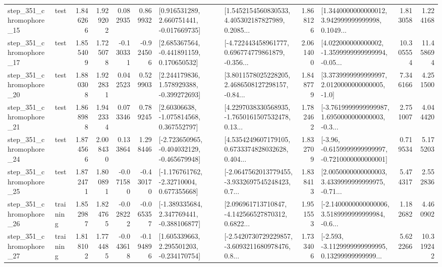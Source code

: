 \begin{tabular}{llrrrrllrlrr}
  step\_351\_chromophore\_15 &      test &      1.846266 &    1.929202 &      0.082935 &  0.869932 &    [0.916531289, 2.660751441, -0.017669735] &  [1.5452154560830533, 4.405302187827989, 0.2085... &       1.868126 &  [1.3440000000000012, 3.942999999999998, 0.1049... &            1.813058 &          1.224168 \\
  step\_351\_chromophore\_17 &      test &      1.855409 &    1.725078 &     -0.130331 & -0.924506 &    [2.685367564, -0.441891159, 0.170650532] &  [-4.722443458961777, 0.696774779861879, -0.356... &       2.061400 &  [4.022000000000002, -1.3599999999999994, -0.05... &           10.305554 &         11.458694 \\
  step\_351\_chromophore\_20 &      test &      1.880308 &    1.922831 &      0.042523 &  0.529903 &    [2.244179836, 1.578929388, -0.399272693] &  [3.8011578025228205, 2.4686508127298157, -0.84... &       1.848779 &     [3.3739999999999997, 2.0120000000000005, -1.0] &            7.346166 &          4.251500 \\
  step\_351\_chromophore\_21 &      test &      1.868988 &    1.942334 &      0.073346 &  0.789245 &     [2.60306638, -1.075814568, 0.367552797] &  [4.2297038330568935, -1.7650161507532478, 0.13... &       1.782462 &  [-3.7619999999999987, 1.6950000000000003, -0.3... &            2.751007 &          4.044420 \\
  step\_351\_chromophore\_24 &      test &      1.874566 &    2.008430 &      0.133864 &  1.298446 &  [-2.723650965, -0.404032129, -0.465679948] &  [4.5354249607179105, 0.6733374828032628, 0.404... &       1.832709 &  [-3.96, -0.6159999999999997, -0.7210000000000001] &            0.719534 &          5.175203 \\
  step\_351\_chromophore\_25 &      test &      1.872471 &    1.800891 &     -0.071580 & -0.430170 &    [-1.176761762, -2.32710004, 0.677355668] &  [-2.0647562013779455, -3.9332697545248423, 0.7... &       1.838413 &  [2.0050000000000003, 3.4339999999999975, -0.71... &            5.474317 &          2.552836 \\
  step\_351\_chromophore\_26 &  training &      1.852987 &    1.824765 &     -0.028222 & -0.065357 &   [-1.389335684, 2.347769441, -0.388106877] &  [2.096961713710847, -4.142566527870312, 0.6822... &       1.951553 &  [-2.1400000000000006, 3.5189999999999984, -0.6... &            1.182682 &          4.460902 \\
  step\_351\_chromophore\_27 &  training &      1.818102 &    1.774485 &     -0.043618 & -0.194896 &    [1.605339663, 2.295501203, -0.234170754] &  [-2.5420730729229857, -3.6093211680978476, 0.8... &       1.733406 &  [-2.593, -3.1129999999999995, 0.13299999999999... &            5.622266 &         10.319242 \\

\end{tabular}
